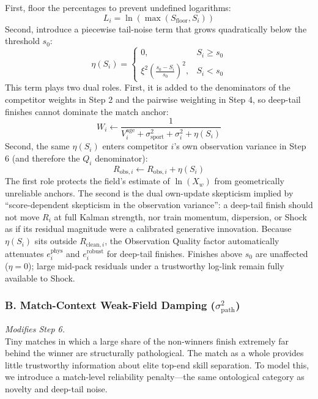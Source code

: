 \documentclass[12pt]{article}
\newcommand{\xwin}{X_w}
\newcommand{\ephys}{e_i^{\mathrm{phys}}}
\newcommand{\erobust}{e_i^{\mathrm{robust}}}
\begin{document}
	First, floor the percentages to prevent undefined logarithms:
	\begin{equation}
		L_i = \ln(\max(S_{\mathrm{floor}}, S_i))
	\end{equation}
	Second, introduce a piecewise tail-noise term that grows quadratically below the threshold $s_0$:
	\begin{equation}
		\eta(S_i) =
		\begin{cases}
			0, & S_i \ge s_0 \\
			\xi^2 \left(\frac{s_0 - S_i}{s_0}\right)^2, & S_i < s_0
		\end{cases}
	\end{equation}
	This term plays two dual roles. First, it is added to the denominators of the competitor weights in Step 2 and the pairwise weighting in Step 4, so deep-tail finishes cannot dominate the match anchor:
	\begin{equation}
		W_i \leftarrow \frac{1}{V_i^{\mathrm{age}} + \sigma_{\mathrm{sport}}^2 + \sigma_i^2 + \eta(S_i)}
	\end{equation}
	Second, the same $\eta(S_i)$ enters competitor $i$'s own observation variance in Step 6 (and therefore the $Q_i$ denominator):
	\begin{equation}
		R_{\mathrm{obs},i} \leftarrow R_{\mathrm{obs},i} + \eta(S_i)
	\end{equation}
	The first role protects the field's estimate of $\ln(\xwin)$ from geometrically unreliable anchors. The second is the dual own-update skepticism implied by ``score-dependent skepticism in the observation variance'': a deep-tail finish should not move $R_i$ at full Kalman strength, nor train momentum, dispersion, or Shock as if its residual magnitude were a calibrated generative innovation. Because $\eta(S_i)$ sits outside $R_{\mathrm{clean},i}$, the Observation Quality factor automatically attenuates $\ephys$ and $\erobust$ for deep-tail finishes. Finishes above $s_0$ are unaffected ($\eta = 0$); large mid-pack residuals under a trustworthy log-link remain fully available to Shock.

	\subsubsection*{B. Match-Context Weak-Field Damping ($\sigma_{\mathrm{path}}^2$)}
	\label{sec:weakfield}
	\emph{Modifies Step 6.}\\
	Tiny matches in which a large share of the non-winners finish extremely far behind the winner are structurally pathological. The match as a whole provides little trustworthy information about elite top-end skill separation. To model this, we introduce a match-level reliability penalty---the same ontological category as novelty and deep-tail noise.
\end{document}
